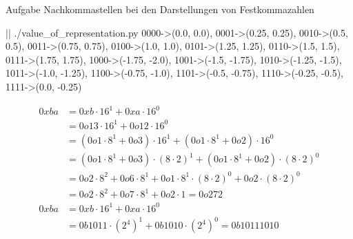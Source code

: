 \begin{frame}{Aufgabe \thesection}{Nachkommastellen bei den Darstellungen von Festkommazahlen\vspace{0.5cm}}
    \begin{requirementsnoinc}
    \end{requirementsnoinc}
    \begin{requirementsnoinc}
        \begin{terminal}
            |\prompt| ./value_of_representation.py
            {0000->(0.0, 0.0), 0001->(0.25, 0.25), 0010->(0.5, 0.5), 0011->(0.75, 0.75), 0100->(1.0, 1.0), 0101->(1.25, 1.25), 
            0110->(1.5, 1.5), 0111->(1.75, 1.75),  1000->(-1.75, -2.0), 1001->(-1.5, -1.75), 1010->(-1.25, -1.5), 
            1011->(-1.0, -1.25), 1100->(-0.75, -1.0), 1101->(-0.5, -0.75), 1110->(-0.25, -0.5), 1111->(0.0, -0.25)}        
        \end{terminal}
    \end{requirementsnoinc}

    \begin{solutionnoinc}
        \tiny
        \begin{align*}
            0xba &= 0xb \cdot 16^1 + 0xa \cdot 16^0\\
            &= 0o13 \cdot 16^1 + 0o12 \cdot 16^0\\
            &= (0o1 \cdot 8^1 + 0o3) \cdot 16^1 + (0o1 \cdot 8^1+  0o2) \cdot 16^0\\
            &= (0o1 \cdot 8^1 + 0o3) \cdot (8 \cdot 2)^1 + (0o1 \cdot 8^1+  0o2) \cdot (8 \cdot 2)^0\\
            &= 0o2 \cdot 8^2 + 0o6 \cdot 8^1 + 0o1 \cdot 8^1 \cdot (8 \cdot 2)^0 + 0o2 \cdot (8 \cdot 2)^0\\
            &= 0o2 \cdot 8^2 + 0o7 \cdot 8^1 + 0o2 \cdot 1 = 0o272 \\
            0xba &= 0xb \cdot 16^1 + 0xa \cdot 16^0\\
            &= 0b1011 \cdot (2^4)^1 + 0b1010 \cdot (2^4)^0 = 0b10111010 
        \end{align*}
    \end{solutionnoinc}


\end{frame}
